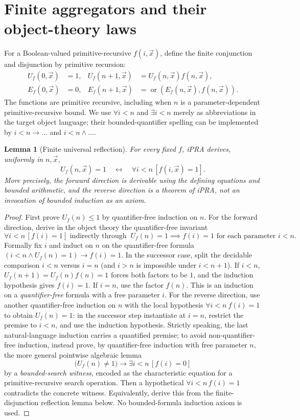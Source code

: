 \documentclass[11pt]{article}
\newtheorem{lemma}[theorem]{Lemma}
\begin{document}
\section{Finite aggregators and their object-theory laws}
For a Boolean-valued primitive-recursive $f(i,\vec x)$, define the finite conjunction and disjunction by primitive recursion:
\begin{align*}
U_f(0,\vec x)&=1,&U_f(n+1,\vec x)&=U_f(n,\vec x) f(n,\vec x),\\
E_f(0,\vec x)&=0,&E_f(n+1,\vec x)&=\operatorname{or}(E_f(n,\vec x),f(n,\vec x)).
\end{align*}
The functions are primitive recursive, including when $n$ is a parameter-dependent primitive-recursive bound. We use $\forall i<n$ and $\exists i<n$ merely as abbreviations in the target object language; their bounded-quantifier spelling can be implemented by $i<n\to\dots$ and $i<n\land\dots$.
\begin{lemma}[Finite universal reflection]\label{lem:universal}
For every fixed $f$, iPRA derives, uniformly in $n,\vec x$,
\[U_f(n,\vec x)=1\quad\longleftrightarrow\quad \forall i<n\,[f(i,\vec x)=1].\]
More precisely, the forward direction is derivable using the defining equations and bounded arithmetic, and the reverse direction is a theorem of iPRA, not an invocation of bounded induction as an axiom.
\end{lemma}
\begin{proof}
First prove $U_f(n)\le1$ by quantifier-free induction on $n$. For the forward direction, derive in the object theory the quantifier-free invariant
\[\forall i<n\,[f(i)=1] \text{ indirectly through }\ U_f(n)=1\implies f(i)=1\text{ for each parameter }i<n.\]
Formally fix $i$ and induct on $n$ on the quantifier-free formula $(i<n\wedge U_f(n)=1)\to f(i)=1$. In the successor case, split the decidable comparison $i<n$ versus $i=n$ (and $i>n$ is impossible under $i<n+1$). If $i<n$, $U_f(n+1)=U_f(n)f(n)=1$ forces both factors to be $1$, and the induction hypothesis gives $f(i)=1$. If $i=n$, use the factor $f(n)$. This is an induction on a \emph{quantifier-free} formula with a free parameter $i$. For the reverse direction, use another quantifier-free induction on $n$ with the local hypothesis $\forall i<n\ f(i)=1$ to obtain $U_f(n)=1$: in the successor step instantiate at $i=n$, restrict the premise to $i<n$, and use the induction hypothesis. Strictly speaking, the last natural-language induction carries a quantified premise; to avoid non-quantifier-free induction, instead prove, by quantifier-free induction with free parameter $n$, the more general pointwise algebraic lemma
\[\bigl(U_f(n)\neq1\bigr)\to \exists i<n\,[f(i)=0]\]
by a \emph{bounded-search witness}, encoded as the characteristic equation for a primitive-recursive search operation. Then a hypothetical $\forall i<n\,f(i)=1$ contradicts the concrete witness. Equivalently, derive this from the finite-disjunction reflection lemma below. No bounded-formula induction axiom is used.
\end{proof}
\end{document}
